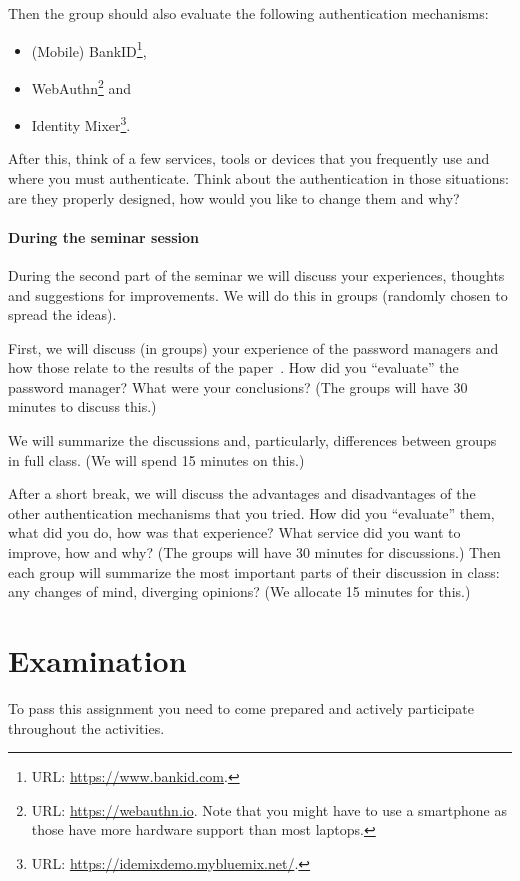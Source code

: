Then the group should also evaluate the following authentication mechanisms:
\begin{itemize}
  \item (Mobile) BankID\footnote{%
      URL: \url{https://www.bankid.com}.
    },
  \item WebAuthn\footnote{%
      URL: \url{https://webauthn.io}.
      Note that you might have to use a smartphone as those have more hardware 
      support than most laptops.
    } and
  \item Identity Mixer\footnote{%
      URL: \url{https://idemixdemo.mybluemix.net/}.
    }.
\end{itemize}

After this, think of a few services, tools or devices that you frequently use 
and where you must authenticate.
Think about the authentication in those situations: are they properly designed, 
how would you like to change them and why?

\paragraph{During the seminar session}

During the second part of the seminar we will discuss your experiences, 
thoughts and suggestions for improvements.
We will do this in groups (randomly chosen to spread the ideas).

First, we will discuss (in groups) your experience of the password managers and 
how those relate to the results of the 
paper~\cite{UsabilityEvaluationOfPasswordManagers}.
How did you \enquote{evaluate} the password manager?
What were your conclusions?
(The groups will have 30 minutes to discuss this.)

We will summarize the discussions and, particularly, differences between groups 
in full class.
(We will spend 15 minutes on this.)

After a short break, we will discuss the advantages and disadvantages of the 
other authentication mechanisms that you tried.
How did you \enquote{evaluate} them, what did you do, how was that experience?
What service did you want to improve, how and why?
(The groups will have 30 minutes for discussions.)
Then each group will summarize the most important parts of their discussion in 
class: any changes of mind, diverging opinions?
(We allocate 15 minutes for this.)


\section{Examination}%
\label{sec:exam}

To pass this assignment you need to come prepared and actively participate 
throughout the activities.


\printbibliography

